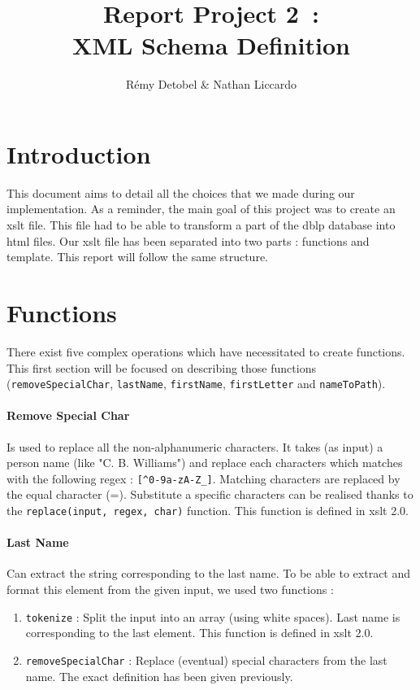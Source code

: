 \documentclass{article}
\author{R\'emy Detobel \& Nathan Liccardo}
\title{Report Project 2~:\\XML Schema Definition}
\begin{document}
\maketitle

\section{Introduction}
This document aims to detail all the choices that we made during our implementation. As a reminder, the main goal of this project was to create an xslt file. This file had to be able to transform a part of the dblp database into html files. Our xslt file has been separated into two parts : functions and template. This report will follow the same structure.

\section{Functions}
There exist five complex operations which have necessitated to create functions. This first section will be focused on describing those functions (\verb|removeSpecialChar|, \verb|lastName|, \verb|firstName|, \verb|firstLetter| and \verb|nameToPath|).

\paragraph{Remove Special Char} Is used to replace all the non-alphanumeric characters. It takes (as input) a person name (like "C. B. Williams") and replace each characters which matches with the following regex : \verb|[^0-9a-zA-Z_]|. Matching characters are replaced by the equal character (=). Substitute a specific characters can be realised thanks to the \verb|replace(input, regex, char)| function. This function is defined in xslt 2.0.

\paragraph{Last Name} Can extract the string corresponding to the last name. To be able to extract and format this element from the given input, we used two functions : 
\begin{enumerate}
\item \verb|tokenize| : Split the input into an array (using white spaces). Last name is corresponding to the last element. This function is defined in xslt 2.0.
\item \verb|removeSpecialChar| : Replace (eventual) special characters from the last name. The exact definition has been given previously.
\end{enumerate}
\end{document}
